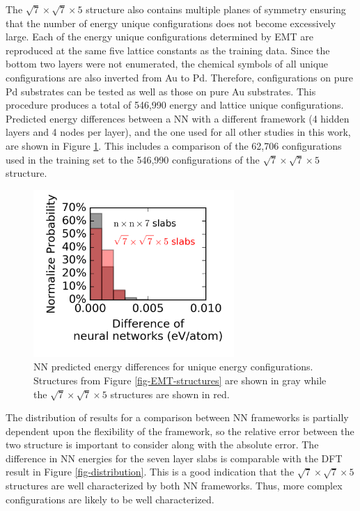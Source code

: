 \documentclass[12pt,oneside]{cmuthesis}
\begin{document}
The \(\sqrt{7} \times \sqrt{7} \times 5\) structure also contains multiple planes of symmetry ensuring that the number of energy unique configurations does not become excessively large. Each of the energy unique configurations determined by EMT are reproduced at the same five lattice constants as the training data. Since the bottom two layers were not enumerated, the chemical symbols of all unique configurations are also inverted from Au to Pd. Therefore, configurations on pure Pd substrates can be tested as well as those on pure Au substrates. This procedure produces a total of 546,990 energy and lattice unique configurations. Predicted energy differences between a NN with a different framework (4 hidden layers and 4 nodes per layer), and the one used for all other studies in this work, are shown in Figure \ref{fig-nn-diff}. This includes a comparison of the 62,706 configurations used in the training set to the 546,990 configurations of the \(\sqrt{7} \times \sqrt{7} \times 5\) structure.

\begin{figure}[h]
\centering
\includegraphics[width=3in]{./images/nn-diff.png}
\caption{\label{fig-nn-diff}
NN predicted energy differences for unique energy configurations. Structures from Figure \ref{fig-EMT-structures} are shown in gray while the \(\sqrt{7} \times \sqrt{7} \times 5\) structures are shown in red.}
\end{figure}

The distribution of results for a comparison between NN frameworks is partially dependent upon the flexibility of the framework, so the relative error between the two structure is important to consider along with the absolute error. The difference in NN energies for the seven layer slabs is comparable with the DFT result in Figure \ref{fig-distribution}. This is a good indication that the \(\sqrt{7} \times \sqrt{7} \times 5\) structures are well characterized by both NN frameworks. Thus, more complex configurations are likely to be well characterized.
\end{document}
